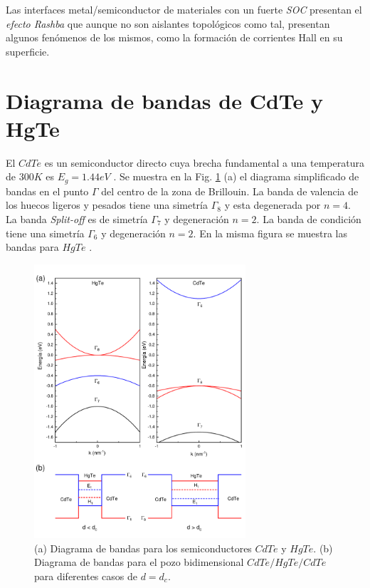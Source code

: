 Las interfaces metal/semiconductor de materiales con un fuerte \textit{SOC} presentan el \textit{efecto Rashba} que aunque no son aislantes topológicos como tal, presentan algunos fenómenos de los mismos, como la formación de corrientes Hall en su superficie.\cite{Lin2014}\cite{Bihlmayer2015}

\section{Diagrama de bandas de CdTe y HgTe}
\label{ch1-band-diagram}
El $ CdTe $ es un semiconductor directo cuya brecha fundamental a una temperatura de $300 K $ es $ E_{g}=1.44 eV $ \cite{Kittel2004-yd}\cite{Chadi1972}. Se muestra en la Fig. \ref{fig:band_diagram} (a) el diagrama simplificado de bandas en el punto $ \Gamma $ del centro de la zona de Brillouin\cite{Chadi1972}. La banda de valencia de los huecos ligeros y pesados tiene una simetría $ \Gamma_{8} $ y esta degenerada por $n=4$. La banda \textit{Split-off} es de simetría $ \Gamma_{7} $ y degeneración $n=2$. La banda de condición tiene una simetría  $ \Gamma_{6} $ y degeneración $n=2$. En la misma figura se muestra las bandas para $ HgTe $ \cite{Chadi1972}.

\begin{figure}[H]
    \centering
    \includegraphics[width=0.7\textwidth]{figures/chap3/band_diagram.pdf}
        \caption{(a) Diagrama de bandas para los semiconductores $ CdTe $ y $ HgTe $. (b) Diagrama de bandas para el pozo bidimensional $ CdTe/HgTe/CdTe $ para diferentes casos de $ d = d_{c} $.\cite{Bernevig2006}}
    \label{fig:band_diagram}
\end{figure}

